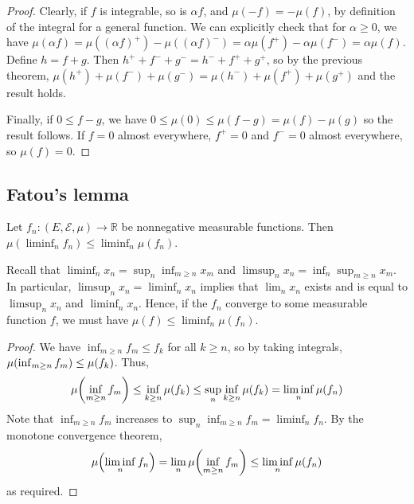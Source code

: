 \begin{proof}
	Clearly, if \( f \) is integrable, so is \( \alpha f \), and \( \mu(-f) = -\mu(f) \), by definition of the integral for a general function.
	We can explicitly check that for \( \alpha \geq 0 \), we have \( \mu(\alpha f) = \mu((\alpha f)^+) - \mu((\alpha f)^-) = \alpha \mu(f^+) - \alpha \mu(f^-) = \alpha \mu(f) \).
	Define \( h = f + g \).
	Then \( h^+ + f^- + g^- = h^- + f^+ + g^+ \), so by the previous theorem, \( \mu(h^+) + \mu(f^-) + \mu(g^-) = \mu(h^-) + \mu(f^+) + \mu(g^+) \) and the result holds.

	Finally, if \( 0 \leq f - g \), we have \( 0 \leq \mu(0) \leq \mu(f - g) = \mu(f) - \mu(g) \) so the result follows.
	If \( f = 0 \) almost everywhere, \( f^+ = 0 \) and \( f^- = 0 \) almost everywhere, so \( \mu(f) = 0 \).
\end{proof}

\subsection{Fatou's lemma}
\begin{lemma}
	Let \( f_n \colon (E, \mathcal E, \mu) \to \mathbb R \) be nonnegative measurable functions.
	Then \( \mu (\liminf_n f_n) \leq \liminf_n \mu(f_n) \).
\end{lemma}
\begin{remark}
	Recall that \( \liminf_n x_n = \sup_n \inf_{m \geq n} x_m \) and \( \limsup_n x_n = \inf_n \sup_{m \geq n} x_m \).
	In particular, \( \limsup_n x_n = \liminf_n x_n \) implies that \( \lim_n x_n \) exists and is equal to \( \limsup_n x_n \) and \( \liminf_n x_n \).
	Hence, if the \( f_n \) converge to some measurable function \( f \), we must have \( \mu(f) \leq \liminf_n \mu(f_n) \).
\end{remark}
\begin{proof}
	We have \( \inf_{m \geq n} f_m \leq f_k \) for all \( k \geq n \), so by taking integrals, \( \mu\qty(\inf_{m \geq n} f_m) \leq \mu(f_k) \).
	Thus,
	\[ \mu\qty(\inf_{m \geq n} f_m) \leq \inf_{k \geq n} \mu(f_k) \leq \sup_n \inf_{k \geq n} \mu(f_k) = \liminf_n \mu(f_n) \]
	Note that \( \inf_{m \geq n} f_m \) increases to \( \sup_n \inf_{m \geq n} f_m = \liminf_n f_n \).
	By the monotone convergence theorem,
	\[ \mu\qty(\liminf_n f_n) = \lim_n \mu\qty(\inf_{m \geq n} f_m) \leq \liminf_n \mu(f_n) \]
	as required.
\end{proof}

